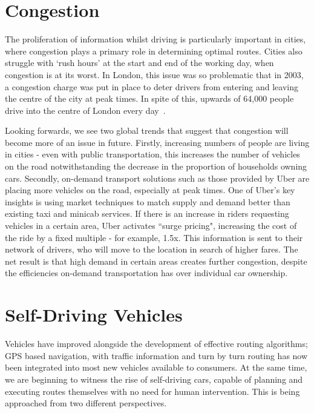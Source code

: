 \documentclass[ %
                    author={Alexander Hill},
                supervisor={Dr. Benjamin Sach},
                    degree={MEng},
                     title={MARMOSET},
                  subtitle={Multi-Agent Route Management using Online Simulation for Efficient Transportation},
                      type={research},
                      year={2016} ]{dissertation}
\begin{document}
\section{Congestion}

The proliferation of information whilst driving is particularly important in
cities, where congestion plays a primary role in determining optimal routes.
Cities also struggle with `rush hours' at the start and end of the working day,
when congestion is at its worst. In London, this issue was so problematic that
in 2003, a congestion charge was put in place to deter drivers from entering
and leaving the centre of the city at peak times. In spite of this, upwards of
64,000 people drive into the centre of London every day~\cite{tfl}.

Looking forwards, we see two global trends that suggest that congestion will
become more of an issue in future. Firstly, increasing numbers of people are
living in cities - even with public transportation, this increases the number of
vehicles on the road notwithstanding the decrease in the proportion of
households owning cars. Secondly, on-demand transport solutions such as those
provided by Uber are placing more vehicles on the road, especially at peak
times. One of Uber's key insights is using market techniques to match supply and
demand better than existing taxi and minicab services. If there is an increase
in riders requesting vehicles in a certain area, Uber activates ``surge
pricing", increasing the cost of the ride by a fixed multiple - for example,
1.5x. This information is sent to their network of drivers, who will move to the
location in search of higher fares. The net result is that high demand in
certain areas creates further congestion, despite the efficiencies on-demand
transportation has over individual car ownership.

\section{Self-Driving Vehicles}

Vehicles have improved alongside the development of effective routing
algorithms; GPS based navigation, with traffic information and turn by turn
routing has now been integrated into most new vehicles available to consumers. At
the same time, we are beginning to witness the rise of self-driving cars,
capable of planning and executing routes themselves with no need for human
intervention. This is being approached from two different perspectives.
\end{document}
